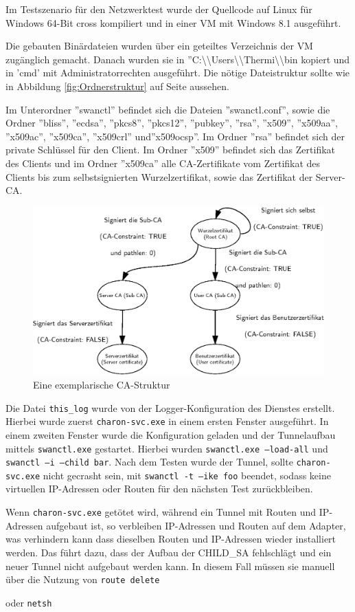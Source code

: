 {Im Testszenario für den Netzwerktest wurde der Quellcode auf Linux für Windows 64-Bit cross kompiliert
und in einer \ac{VM} mit Windows 8.1 ausgeführt.

Die gebauten Binärdateien wurden über ein geteiltes Verzeichnis der \ac{VM}
zugänglich gemacht. Danach wurden sie in ''C:\textbackslash{}\textbackslash{}Users\textbackslash{}\textbackslash{}Thermi\textbackslash{}\textbackslash{}bin
kopiert und in 'cmd' mit Administratorrechten ausgeführt. 
Die nötige Dateistruktur sollte wie in Abbildung \ref{fig:Ordnerstruktur} 
auf Seite \pageref{fig:Ordnerstruktur} aussehen.

Im Unterordner ''swanctl'' befindet sich die Dateien ''swanctl.conf'',
sowie die Ordner ''bliss'', ''ecdsa'', ''pkcs8'', ''pkcs12'', ''pubkey'', ''rsa'', ''x509'',
''x509aa'', ''x509ac'', ''x509ca'', ''x509crl'' und''x509ocsp''.
Im Ordner ''rsa'' befindet sich der private Schlüssel für den Client. Im Ordner
''x509'' befindet sich das Zertifikat des Clients und im Ordner ''x509ca'' alle
\ac{CA}-Zertifikate vom Zertifikat des Clients bis zum selbstsignierten Wurzelzertifikat,
sowie das Zertifikat der Server-\ac{CA}.

\begin{figure}
\def\svgwidth{\columnwidth}
\includegraphics[width=\textwidth]{CA-Struktur.eps}
\caption{Eine exemplarische CA-Struktur}
\label{fig:CA-Struktur}
\end{figure}

Die Datei \texttt{this\_log} wurde von der Logger-Konfiguration des Dienstes erstellt.
Hierbei wurde zuerst \texttt{charon-svc.exe}
in einem ersten Fenster ausgeführt. In einem zweiten Fenster wurde die Konfiguration geladen
und der Tunnelaufbau mittels \texttt{swanctl.exe} gestartet. Hierbei wurden \texttt{swanctl.exe --load-all} und \texttt{swanctl --i --child bar}.
Nach dem Testen wurde der Tunnel, sollte \texttt{charon-svc.exe} nicht gecrasht sein, mit \texttt{swanctl -t --ike foo}
beendet, sodass keine virtuellen IP-Adressen oder Routen für den nächsten Test zurückbleiben.

Wenn \texttt{charon-svc.exe} getötet wird, während ein Tunnel mit Routen und \ac{IP}-Adressen
aufgebaut ist, so verbleiben IP-Adressen und Routen auf dem Adapter, was verhindern kann dass
dieselben Routen und \ac{IP}-Adressen wieder installiert werden. Das führt dazu, dass der
Aufbau der CHILD\_SA fehlschlägt und ein neuer Tunnel nicht aufgebaut werden kann.
In diesem Fall müssen sie manuell über die Nutzung von \texttt{route delete}} oder \texttt{netsh}

